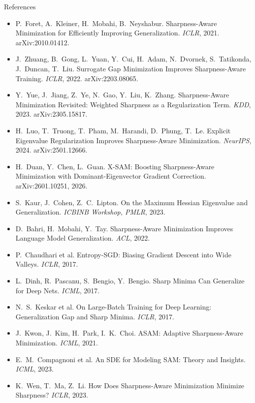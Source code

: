 \documentclass[aspectratio=169,10pt]{beamer}
\begin{document}
\begin{frame}[allowframebreaks]{References}
\footnotesize
\begin{itemize}\setlength{\itemsep}{0.35em}
  \item P.~Foret, A.~Kleiner, H.~Mobahi, B.~Neyshabur. Sharpness-Aware Minimization for Efficiently Improving Generalization. \emph{ICLR}, 2021. arXiv:2010.01412.
  \item J.~Zhuang, B.~Gong, L.~Yuan, Y.~Cui, H.~Adam, N.~Dvornek, S.~Tatikonda, J.~Duncan, T.~Liu. Surrogate Gap Minimization Improves Sharpness-Aware Training. \emph{ICLR}, 2022. arXiv:2203.08065.
  \item Y.~Yue, J.~Jiang, Z.~Ye, N.~Gao, Y.~Liu, K.~Zhang. Sharpness-Aware Minimization Revisited: Weighted Sharpness as a Regularization Term. \emph{KDD}, 2023. arXiv:2305.15817.
  \item H.~Luo, T.~Truong, T.~Pham, M.~Harandi, D.~Phung, T.~Le. Explicit Eigenvalue Regularization Improves Sharpness-Aware Minimization. \emph{NeurIPS}, 2024. arXiv:2501.12666.
  \item H.~Duan, Y.~Chen, L.~Guan. X-SAM: Boosting Sharpness-Aware Minimization with Dominant-Eigenvector Gradient Correction. arXiv:2601.10251, 2026.
  \item S.~Kaur, J.~Cohen, Z.~C.~Lipton. On the Maximum Hessian Eigenvalue and Generalization. \emph{ICBINB Workshop, PMLR}, 2023.
  \item D.~Bahri, H.~Mobahi, Y.~Tay. Sharpness-Aware Minimization Improves Language Model Generalization. \emph{ACL}, 2022.
  \item P.~Chaudhari et al. Entropy-SGD: Biasing Gradient Descent into Wide Valleys. \emph{ICLR}, 2017.
  \item L.~Dinh, R.~Pascanu, S.~Bengio, Y.~Bengio. Sharp Minima Can Generalize for Deep Nets. \emph{ICML}, 2017.
  \item N.~S.~Keskar et al. On Large-Batch Training for Deep Learning: Generalization Gap and Sharp Minima. \emph{ICLR}, 2017.
  \item J.~Kwon, J.~Kim, H.~Park, I.~K.~Choi. ASAM: Adaptive Sharpness-Aware Minimization. \emph{ICML}, 2021.
  \item E.~M.~Compagnoni et al. An SDE for Modeling SAM: Theory and Insights. \emph{ICML}, 2023.
  \item K.~Wen, T.~Ma, Z.~Li. How Does Sharpness-Aware Minimization Minimize Sharpness? \emph{ICLR}, 2023.
\end{itemize}
\end{frame}
\end{document}

